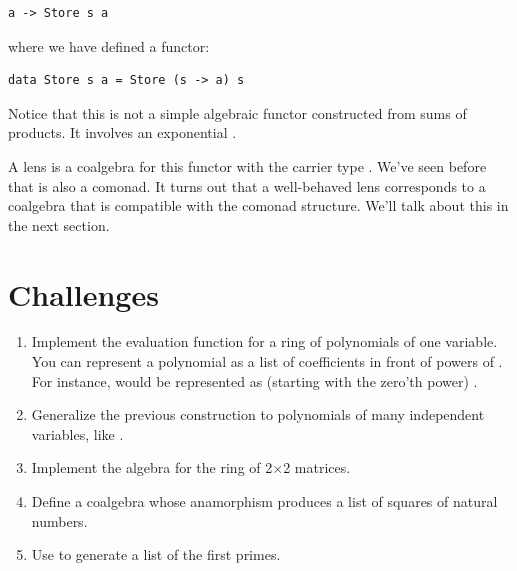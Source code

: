 \begin{Verbatim}[commandchars=\\\{\}]
a -> Store s a
\end{Verbatim}
where we have defined a functor:

\begin{Verbatim}[commandchars=\\\{\}]
data Store s a = Store (s -> a) s
\end{Verbatim}
Notice that this is not a simple algebraic functor constructed from sums
of products. It involves an exponential .

A lens is a coalgebra for this functor with the carrier type .
We've seen before that  is also a comonad. It turns out
that a well-behaved lens corresponds to a coalgebra that is compatible
with the comonad structure. We'll talk about this in the next section.

\section{Challenges}\label{challenges}

\begin{enumerate}
\tightlist
\item
  Implement the evaluation function for a ring of polynomials of one
  variable. You can represent a polynomial as a list of coefficients in
  front of powers of . For instance,  would be
  represented as (starting with the zero'th power)
  \code{{[}-1, 0, 4{]}}.
\item
  Generalize the previous construction to polynomials of many
  independent variables, like .
\item
  Implement the algebra for the ring of 2×2 matrices.
\item
  Define a coalgebra whose anamorphism produces a list of squares of
  natural numbers.
\item
  Use  to generate a list of the first 
  primes.
\end{enumerate}